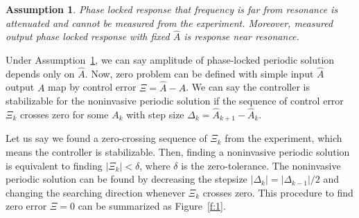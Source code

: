 \documentclass[openacc]{rsproca_new}%
\newcommand{\Fref}[1]{Figure~\ref{#1}}
\newcommand{\asref}[1]{Assumption~\ref{#1}}
\newtheorem{assumption}{\bf Assumption}[section]
\begin{document}
\begin{assumption}\label{a2}
Phase locked response that frequency is far from resonance is attenuated and cannot be measured from the experiment. Moreover, measured output phase locked response with fixed $\hat A$ is response near resonance.
\end{assumption}

\noindent  Under \asref{a2}, we can say amplitude of phase-locked periodic solution depends only on $\hat A$. Now, zero problem can be defined with simple input $\hat A$ output $A$ map by control error $\Xi=\hat A - A$. We can say the controller is stabilizable for the noninvasive periodic solution if the sequence of control error $\Xi_k$ crosses zero for some $A_k$ with step size $\Delta_k=\hat A_{k+1}-\hat A_{k}$.

Let us say we found a zero-crossing sequence of $\Xi_k$ from the experiment, which means the controller is stabilizable. Then, finding a noninvasive periodic solution is equivalent to finding  $|\Xi_k|<\delta$, where $\delta$ is the zero-tolerance. The noninvasive periodic solution can be found by decreasing the stepsize $|\Delta_k|=|\Delta_{k-1}|/2$ and changing the searching direction whenever $\Xi_k$ crosses zero. This procedure to find zero error $\Xi=0$ can be summarized as \Fref{f:1}.
\end{document}
